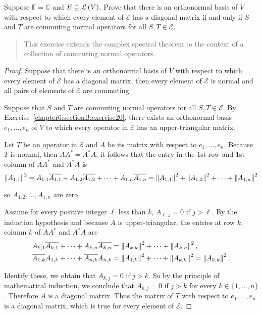 \begin{exercise}
    Suppose $\mathbb{F} = \mathbb{C}$ and $E \subseteq \mathcal{L}\left({V}\right)$. Prove that there is an orthonormal basis of $V$ with respect to which every element of $\mathcal{E}$ has a diagonal matrix if and only if $S$ and $T$ are commuting normal operators for all $S, T \in \mathcal{E}$.
\end{exercise}

\begin{quote}
    This exercise extends the complex spectral theorem to the context of a collection of commuting normal operators.
\end{quote}

\begin{proof}
    Suppose that there is an orthonormal basis of $V$ with respect to which every element of $\mathcal{E}$ has a diagonal matrix, then every element of $\mathcal{E}$ is normal and all pairs of elements of $\mathcal{E}$ are commuting.

    \bigskip

    Suppose that $S$ and $T$ are commuting normal operators for all $S, T \in \mathcal{E}$. By Exercise~\ref{chapter6:sectionB:exercise20}, there exists an orthonormal basis $e_{1}, \ldots, e_{n}$ of $V$ to which every operator in $\mathcal{E}$ has an upper-triangular matrix.

    Let $T$ be an operator in $\mathcal{E}$ and $A$ be its matrix with respect to $e_{1}, \ldots, e_{n}$. Because $T$ is normal, then $AA^{*} = A^{*}A$, it follows that the entry in the 1st row and 1st column of $AA^{*}$ and $A^{*}A$ is
    \[
        \left\Vert{A_{1,1}}\right\Vert^{2} = A_{1,1}\overline{A_{1,1}} + A_{1,2}\overline{A_{1,2}} + \cdots + A_{1,n}\overline{A_{1,n}} = \left\Vert{A_{1,1}}\right\Vert^{2} + \left\Vert{A_{1,2}}\right\Vert^{2} + \cdots + \left\Vert{A_{1,n}}\right\Vert^{2}
    \]

    so $A_{1,2}, \ldots, A_{1,n}$ are zero.

    Assume for every positive integer $\ell$ less than $k$, $A_{\ell, j} = 0$ if $j > \ell$. By the induction hypothesis and because $A$ is upper-triangular, the entries at row $k$, column $k$ of $AA^{*}$ and $A^{*}A$ are
    \begin{align*}
        A_{k,1}\overline{A_{k,1}} + \cdots + A_{k,n}\overline{A_{k,n}} & = \left\Vert{A_{k,k}}\right\Vert^{2} + \cdots + \left\Vert{A_{k,n}}\right\Vert^{2},                      \\
        \overline{A_{1,k}}A_{1,k} + \cdots + \overline{A_{n,k}}A_{n,k} & = \left\Vert{A_{1,k}}\right\Vert^{2} + \cdots + \left\Vert{A_{k,k}}\right\Vert^{2} = \left\Vert{A_{k,k}}\right\Vert^{2}.
    \end{align*}

    Identify these, we obtain that $A_{k,j} = 0$ if $j > k$. So by the principle of mathematical induction, we conclude that $A_{k, j} = 0$ if $j > k$ for every $k\in\{ 1,\ldots, n \}$. Therefore $A$ is a diagonal matrix. Thus the matrix of $T$ with respect to $e_{1}, \ldots, e_{n}$ is a diagonal matrix, which is true for every element of $\mathcal{E}$.
\end{proof}
\newpage

